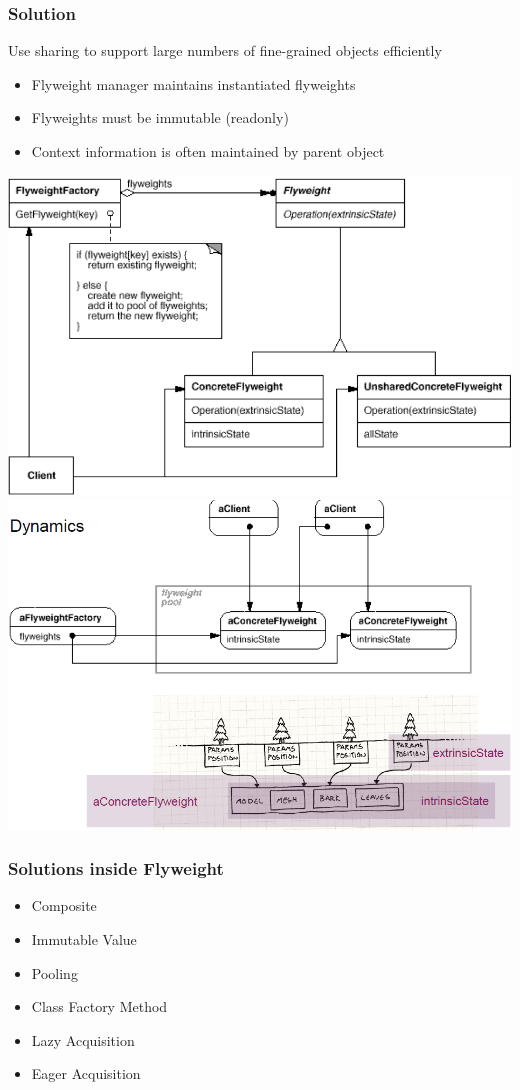 \subsubsection{Solution}
Use sharing to support large numbers of fine-grained objects efficiently
\begin{itemize}
    \item Flyweight manager maintains instantiated flyweights
    \item Flyweights must be immutable (readonly)
    \item Context information is often maintained by parent object
\end{itemize}
\includegraphics[width=\linewidth]{./img/flyweight.png}
\includegraphics[width=\linewidth]{./img/flyweight_dynamic.png}
\subsubsection{Solutions inside Flyweight}
\begin{itemize}
    \item Composite
    \item Immutable Value
    \item Pooling
    \item Class Factory Method
    \item Lazy Acquisition
    \item Eager Acquisition
\end{itemize}
